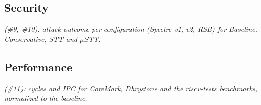 
\subsection{Security}
\label{sec:results_security}

\textit{(\#9, \#10): attack outcome per configuration (Spectre v1, v2, RSB) for Baseline, Conservative, STT and $\mu$STT.}

\subsection{Performance}
\label{sec:results_performance}

\textit{(\#11): cycles and IPC for CoreMark, Dhrystone and the riscv-tests benchmarks, normalized to the baseline.}
